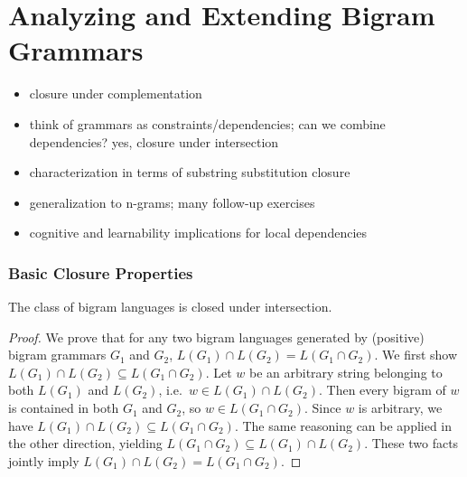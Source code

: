 \chapter{Analyzing and Extending Bigram Grammars}
\label{cha:SLMath}

\begin{itemize}
    \item closure under complementation
    \item think of grammars as constraints/dependencies; can we combine dependencies? yes, closure under intersection
    \item characterization in terms of substring substitution closure
    \item generalization to n-grams; many follow-up exercises
    \item cognitive and learnability implications for local dependencies
\end{itemize}

\subsection{Basic Closure Properties}

\begin{lemma}
    The class of bigram languages is closed under intersection.
\end{lemma}
%
\begin{proof}
    We prove that for any two bigram languages generated by (positive) bigram grammars $G_1$ and $G_2$, $L(G_1) \cap L(G_2) = L(G_1 \cap G_2)$.
    We first show $L(G_1) \cap L(G_2) \subseteq L(G_1 \cap G_2)$.
    Let $w$ be an arbitrary string belonging to both $L(G_1)$ and $L(G_2)$, i.e.\ $w \in L(G_1) \cap L(G_2)$.
    Then every bigram of $w$ is contained in both $G_1$ and $G_2$, so $w \in L(G_1 \cap G_2)$.
    Since $w$ is arbitrary, we have $L(G_1) \cap L(G_2) \subseteq L(G_1 \cap G_2)$.
    The same reasoning can be applied in the other direction, yielding $L(G_1 \cap G_2) \subseteq L(G_1) \cap L(G_2)$.
    These two facts jointly imply $L(G_1) \cap L(G_2) = L(G_1 \cap G_2)$.
\end{proof}
%

